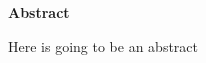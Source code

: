 
\clearemptydoublepage
{}
{}	

\vspace*{2cm}
\begin{center}
{\Large \textbf{Abstract}}
\end{center}
\vspace{1cm}

Here is going to be an abstract
